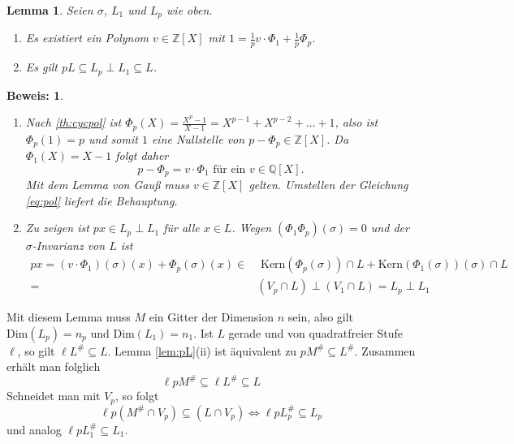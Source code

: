 \documentclass[12pt,a4paper,halfparskip,headsepline,bibtotocnumbered]{scrreprt}
\theoremstyle{nummermitklammern}
\newtheorem{lemma}[defsatzusw]{Lemma}
\theoremstyle{nonumberbreak}
\newtheorem{beweis}{Beweis:}
\newcommand{\Z}{\mathbb{Z}}
\newcommand{\Q}{\mathbb{Q}}
\begin{document}
\begin{framed}
	\begin{lemma}\label{lem:pL}
		Seien $\sigma$, $L_1$ und $L_p$ wie oben.
		\begin{enumerate}[label=(\roman*)]
			\item Es existiert ein Polynom $v \in \Z\left[ X \right]$ mit $1 = \frac{1}{p} v \cdot \Phi_1 + \frac{1}{p}\Phi_p$.
			\item Es gilt $pL \subseteq L_p \perp L_1 \subseteq L$.
		\end{enumerate}
	\end{lemma}
\end{framed}

\begin{beweis}
	\begin{enumerate}[label=(\roman*)]
		\item Nach \eqref{th:cycpol} ist $\Phi_p(X) = \frac{X^p-1}{X-1} = X^{p-1} + X^{p-2} + \dots + 1$, also ist $\Phi_p(1) = p$ und somit $1$ eine Nullstelle von $p - \Phi_p \in \Z\left[ X \right]$. Da $\Phi_1(X) = X-1$ folgt daher 
			\begin{equation}\label{eq:pol}
				p - \Phi_p = v \cdot\Phi_1 \text{ für ein } v \in \Q\left[X\right].
			\end{equation}
			Mit dem Lemma von Gauß muss $v \in \Z \left[ X \right]$ gelten. Umstellen der Gleichung \eqref{eq:pol} liefert die Behauptung.
		\item Zu zeigen ist $p x \in L_p \perp L_1$ für alle $x \in L$. Wegen $(\Phi_1 \Phi_p)(\sigma) = 0$ und der $\sigma$-Invarianz von $L$ ist
			\begin{align*}
				px = (v \cdot \Phi_1)(\sigma)(x) + \Phi_p(\sigma)(x) \in &\text{ Kern}(\Phi_p(\sigma)) \cap L + \text{Kern}(\Phi_1(\sigma))(\sigma) \cap L\\
				=& (V_p \cap L) \perp (V_1 \cap L) = L_p \perp L_1
			\end{align*}
	\end{enumerate}
\end{beweis}

Mit diesem Lemma muss $M$ ein Gitter der Dimension $n$ sein, also gilt $\text{Dim}(L_p) = n_p$ und $\text{Dim}(L_1) = n_1$. Ist $L$ gerade und von quadratfreier Stufe $\ell$, so gilt $\ell L^\# \subseteq L$. Lemma \eqref{lem:pL}(ii) ist äquivalent zu $p M^\# \subseteq L^\#$. Zusammen erhält man folglich
\begin{equation*}
	\ell p M^\# \subseteq \ell L^\# \subseteq L
\end{equation*}
Schneidet man mit $V_p$, so folgt
\begin{equation*}
	\ell p (M^\# \cap V_p) \subseteq (L \cap V_p) \Leftrightarrow \ell p L_p^\# \subseteq L_p
\end{equation*}
und analog $\ell p L_1^\# \subseteq L_1$.
\end{document}
